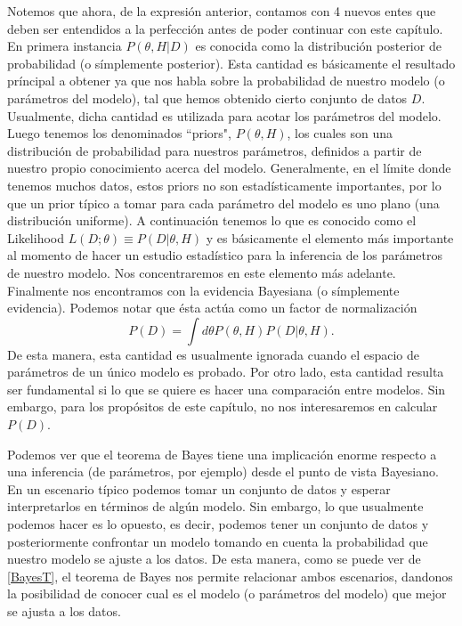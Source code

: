 \documentclass[onecolumn,           %
               showpacs,            %
               preprintnumbers,     %
               aps,                 %
               prl,          	    %
               letterpaper,             %
               superscriptaddress,      %
               nofootinbib,         %
               tightenlines,        %
               floats,floatfix      %
               ,usenatbib,
               ]{revtex4-1}
\begin{document}
Notemos que ahora, de la expresi\'on anterior, contamos con 4 nuevos entes que deben ser entendidos a la perfecci\'on antes de poder continuar con este cap\'itulo.  En primera instancia $P(\theta,H|D)$ es conocida como la distribuci\'on posterior de probabilidad (o s\'implemente posterior). Esta cantidad es b\'asicamente el resultado pr\'incipal a obtener ya que nos habla sobre la probabilidad de nuestro modelo (o par\'ametros del modelo), tal que hemos obtenido cierto conjunto de datos $D$. Usualmente, dicha cantidad es utilizada para acotar los par\'ametros del modelo. Luego tenemos los denominados ``priors", $P(\theta,H)$, los cuales son una distribuci\'on de probabilidad para nuestros par\'ametros, definidos a partir de nuestro propio conocimiento acerca del modelo. Generalmente, en el l\'imite donde tenemos muchos datos, estos priors no son estad\'isticamente importantes, por lo que un prior t\'ipico a tomar para cada par\'ametro del modelo es uno plano (una distribuci\'on uniforme). A continuaci\'on tenemos lo que es conocido como el Likelihood $L(D;\theta)\equiv P(D|\theta,H)$ y es b\'asicamente el elemento m\'as importante al momento de hacer un estudio estad\'istico para la inferencia de los par\'ametros de nuestro modelo. Nos concentraremos en este elemento m\'as adelante. Finalmente nos encontramos con la evidencia Bayesiana (o s\'implemente evidencia). Podemos notar que \'esta act\'ua como un factor de normalizaci\'on
\begin{equation}\label{BayesT}
P(D) = \int d\theta P(\theta,H)P(D|\theta,H).
\end{equation}
De esta manera, esta cantidad es usualmente ignorada cuando el espacio de par\'ametros de un \'unico modelo es probado. Por otro lado, esta cantidad resulta ser fundamental si lo que se quiere es hacer una comparaci\'on entre modelos. Sin embargo, para los prop\'ositos de este cap\'itulo, no nos interesaremos en calcular $P(D)$.

Podemos ver que el teorema de Bayes tiene una implicaci\'on enorme respecto a una inferencia (de par\'ametros, por ejemplo) desde el punto de vista Bayesiano. En un escenario t\'ipico podemos tomar un conjunto de datos y esperar interpretarlos en t\'erminos de alg\'un modelo. Sin embargo, lo que usualmente podemos hacer es lo opuesto, es decir, podemos tener un conjunto de datos y posteriormente confrontar un modelo tomando en cuenta la probabilidad que nuestro modelo se ajuste a los datos. De esta manera, como se puede ver de \eqref{BayesT}, el teorema de Bayes nos permite relacionar ambos escenarios, dandonos la posibilidad de conocer cual es el modelo (o par\'ametros del modelo) que mejor se ajusta a los datos.
\end{document}
